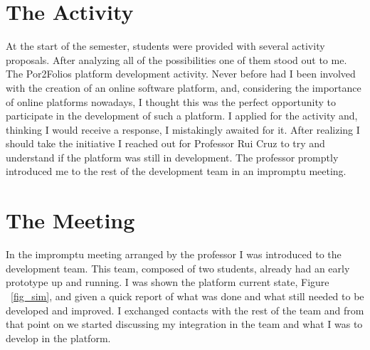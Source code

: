 \documentclass[a4paper,12pt,journal,twoside,compsoc]{PPIEEEtran}
\begin{document}
\section{The Activity}
At the start of the semester, students were provided with several activity proposals. After analyzing all of the possibilities one of them stood out to me. The Por2Folios platform development activity. Never before had I been involved with the creation of an online software platform, and, considering the importance of online platforms nowadays, I thought this was the perfect opportunity to participate in the development of such a platform. I applied for the activity and, thinking I would receive a response, I mistakingly awaited for it. After realizing I should take the initiative I reached out for Professor Rui Cruz to try and understand if the platform was still in development. The professor promptly introduced me to the rest of the development team in an impromptu meeting. 


\section{The Meeting}
In the  impromptu meeting arranged by the professor I was introduced to the development team. This team, composed of two students, already had an early prototype up and running. I was shown the platform current state, Figure ~\ref{fig_sim}, and given a quick report of what was done and what still needed to be developed and improved. I exchanged contacts with the rest of the team and from that point on we started discussing my integration in the team and what I was to develop in the platform.
\end{document}
